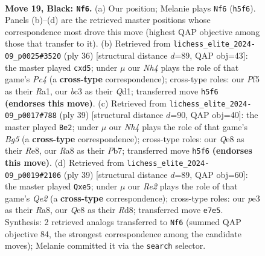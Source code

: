 \documentclass[11pt]{article}
\begin{document}
\clearpage

\begin{figure}[p]\centering
\begin{subfigure}{0.46\textwidth}\centering
\resizebox{\linewidth}{!}{%
\newchessgame
\chessboard[
  setfen={rnb1q1k1/1p2r1pp/8/p2pNp1n/8/2B1P1P1/P4PBP/1R1QR1K1 b - - 1 19},
  showmover=false,
  pgfstyle=straightmove, color=movearrow, markmove={h5-f6}
]}
\caption{}
\end{subfigure}\hfill
\begin{subfigure}{0.46\textwidth}\centering
\resizebox{\linewidth}{!}{%
\newchessgame
\chessboard[
  setfen={r2qr1k1/1ppb1pp1/7p/p2pP1n1/2P5/3BRN1P/PP3PP1/R2Q2K1 w - - 1 19},
  showmover=false,
  pgfstyle=straightmove, color=movearrow, markmove={c4-d5}
]}
\caption{}
\end{subfigure}
\\[4pt]
\begin{subfigure}{0.46\textwidth}\centering
\resizebox{\linewidth}{!}{%
\newchessgame
\chessboard[
  setfen={r3r1k1/1p1n2p1/1ppq3p/4p1N1/4P1bQ/2BP4/P1P3PP/R4R1K b - - 1 20},
  showmover=false,
  pgfstyle=straightmove, color=movearrow, markmove={g4-e2}
]}
\caption{}
\end{subfigure}\hfill
\begin{subfigure}{0.46\textwidth}\centering
\resizebox{\linewidth}{!}{%
\newchessgame
\chessboard[
  setfen={r2r2k1/1p2q1pp/8/p1n1Np2/2Ppb3/PP4P1/5PBP/R2QR1K1 b - - 0 20},
  showmover=false,
  pgfstyle=straightmove, color=movearrow, markmove={e7-e5}
]}
\caption{}
\end{subfigure}
\caption{\textbf{Move 19, Black: \texttt{Nf6}.} (a) Our position; Melanie plays \texttt{Nf6} (\texttt{h5f6}). Panels (b)--(d) are the retrieved master positions whose correspondence most drove this move (highest QAP objective among those that transfer to it). (b) Retrieved from \texttt{lichess\_elite\_2024-09\_p0025\#3520} (ply 36) [structural distance $d$=89, QAP obj=43]: the master played \texttt{cxd5}; under $\mu$ our \emph{Nh4} plays the role of that game's \emph{Pc4} (a \textbf{cross-type} correspondence); cross-type roles: our \emph{P}f5 as their \emph{R}a1, our \emph{b}c3 as their \emph{Q}d1; transferred move \texttt{h5f6} \textbf{(endorses this move)}. (c) Retrieved from \texttt{lichess\_elite\_2024-09\_p0017\#788} (ply 39) [structural distance $d$=90, QAP obj=40]: the master played \texttt{Be2}; under $\mu$ our \emph{Nh4} plays the role of that game's \emph{Bg5} (a \textbf{cross-type} correspondence); cross-type roles: our \emph{Q}e8 as their \emph{R}e8, our \emph{R}a8 as their \emph{P}b7; transferred move \texttt{h5f6} \textbf{(endorses this move)}. (d) Retrieved from \texttt{lichess\_elite\_2024-09\_p0019\#2106} (ply 39) [structural distance $d$=89, QAP obj=60]: the master played \texttt{Qxe5}; under $\mu$ our \emph{Re2} plays the role of that game's \emph{Qe2} (a \textbf{cross-type} correspondence); cross-type roles: our \emph{p}e3 as their \emph{R}a8, our \emph{Q}e8 as their \emph{R}d8; transferred move \texttt{e7e5}. Synthesis: 2 retrieved analogs transferred to \texttt{Nf6} (summed QAP objective 84, the strongest correspondence among the candidate moves); Melanie committed it via the \texttt{search} selector.}
\label{fig:thought-m37}
\end{figure}
\end{document}
